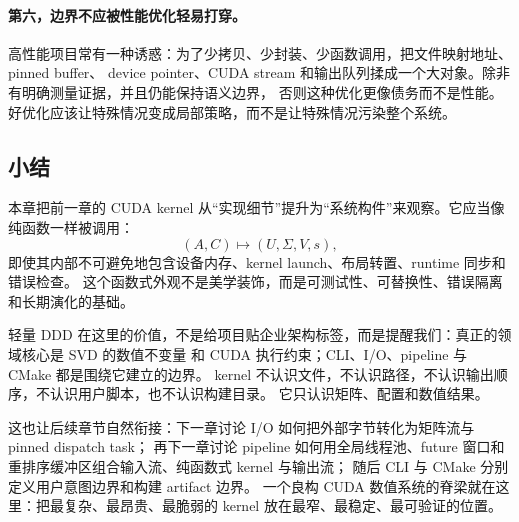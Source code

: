 \paragraph{第六，边界不应被性能优化轻易打穿。}
高性能项目常有一种诱惑：为了少拷贝、少封装、少函数调用，把文件映射地址、pinned buffer、
device pointer、CUDA stream 和输出队列揉成一个大对象。除非有明确测量证据，并且仍能保持语义边界，
否则这种优化更像债务而不是性能。好优化应该让特殊情况变成局部策略，而不是让特殊情况污染整个系统。

\subsection{小结}

本章把前一章的 CUDA kernel 从“实现细节”提升为“系统构件”来观察。它应当像纯函数一样被调用：
\[
    (A,C)\mapsto(U,\Sigma,V,s),
\]
即使其内部不可避免地包含设备内存、kernel launch、布局转置、runtime 同步和错误检查。
这个函数式外观不是美学装饰，而是可测试性、可替换性、错误隔离和长期演化的基础。

轻量 DDD 在这里的价值，不是给项目贴企业架构标签，而是提醒我们：真正的领域核心是 SVD 的数值不变量
和 CUDA 执行约束；CLI、I/O、pipeline 与 CMake 都是围绕它建立的边界。
kernel 不认识文件，不认识路径，不认识输出顺序，不认识用户脚本，也不认识构建目录。
它只认识矩阵、配置和数值结果。

这也让后续章节自然衔接：下一章讨论 I/O 如何把外部字节转化为矩阵流与 pinned dispatch task；
再下一章讨论 pipeline 如何用全局线程池、future 窗口和重排序缓冲区组合输入流、纯函数式 kernel 与输出流；
随后 CLI 与 CMake 分别定义用户意图边界和构建 artifact 边界。
一个良构 CUDA 数值系统的脊梁就在这里：把最复杂、最昂贵、最脆弱的 kernel 放在最窄、最稳定、最可验证的位置。
